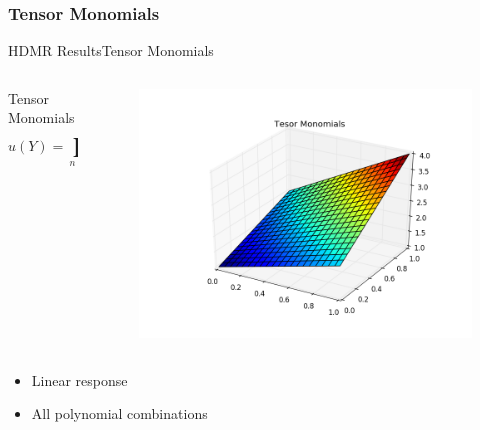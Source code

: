 \documentclass{beamer}
\begin{document}
\subsubsection{Tensor Monomials}
\begin{frame}{HDMR Results}{Tensor Monomials}\vspace{-20pt}
  \begin{columns}
    \begin{column}{0.6\textwidth}
      \begin{block}{Tensor Monomials}
        \[u(Y) = \prod_{n=1}^N (y_n+1)\]
      \end{block}
    \end{column}
    \begin{column}{0.4\textwidth}
        \begin{figure}[h!]
          \centering
          \includegraphics[width=\linewidth]{anlmodels/tensor_monom}
        \end{figure}
    \end{column}
  \end{columns}
  \begin{itemize}
    \item Linear response
    \item All polynomial combinations
  \end{itemize}
\end{frame}
\end{document}
